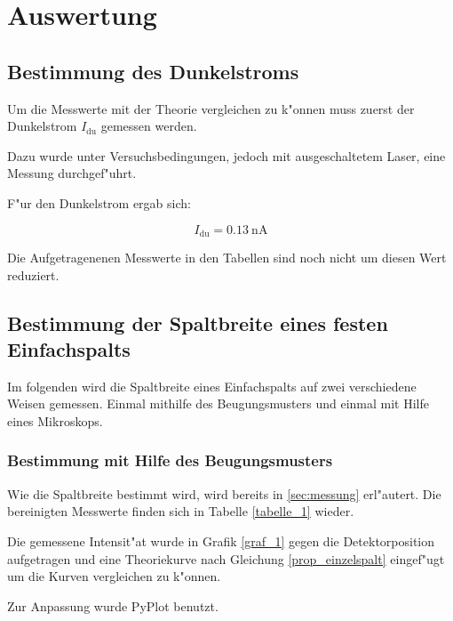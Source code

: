 \section{Auswertung}
	\label{sec:Auswertung}

	\subsection{Bestimmung des Dunkelstroms}
		\label{sub:bestimmung_des_dunkelstroms}
		
		Um die Messwerte mit der Theorie vergleichen zu k"onnen muss zuerst der Dunkelstrom $I_\mathrm{du}$ gemessen werden.

		Dazu wurde unter Versuchsbedingungen, jedoch mit ausgeschaltetem Laser, eine Messung durchgef"uhrt.

		F"ur den Dunkelstrom ergab sich:

		\begin{equation}
			I_\mathrm{du} = \SI{0.13}{\nano \ampere}
		\end{equation}

		Die Aufgetragenenen Messwerte in den Tabellen sind noch nicht um diesen Wert reduziert.

	\subsection{Bestimmung der Spaltbreite eines festen Einfachspalts}
		\label{sub:bestimmung_der_spaltbreite_eines_festen_einfachspalts}
		
		Im folgenden wird die Spaltbreite eines Einfachspalts auf zwei verschiedene Weisen gemessen. Einmal mithilfe des Beugungsmusters und einmal mit Hilfe eines Mikroskops.

		\subsubsection{Bestimmung mit Hilfe des Beugungsmusters}
			\label{sub:Bestimmung_mit_Hilfe_des_Beugungsmusters}

			Wie die Spaltbreite bestimmt wird, wird bereits in \ref{sec:messung} erl"autert. Die bereinigten Messwerte finden sich in Tabelle \ref{tabelle_1} wieder.

			Die gemessene Intensit"at wurde in Grafik \ref{graf_1} gegen die Detektorposition aufgetragen und eine Theoriekurve nach Gleichung \ref{prop_einzelspalt} eingef"ugt um die Kurven vergleichen zu k"onnen.

			Zur Anpassung wurde PyPlot benutzt.

